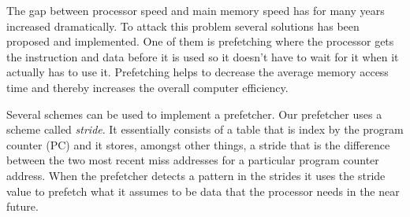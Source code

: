 The gap between processor speed and main memory speed has for many years increased dramatically. To
attack this problem several solutions has been proposed and implemented. One of them is prefetching
where the processor gets the instruction and data before it is used so it doesn't have to wait for
it when it actually has to use it. Prefetching helps to decrease the average memory access time
and thereby increases the overall computer efficiency.

Several schemes can be used to implement a prefetcher. Our prefetcher uses a scheme called
\emph{stride}. It essentially consists of a table that is index by the program counter (PC) and it
stores, amongst other things, a stride that is the difference between the two most recent miss
addresses for a particular program counter address. When the prefetcher detects a pattern in the
strides it uses the stride value to prefetch what it assumes to be data that the processor needs in
the near future.

